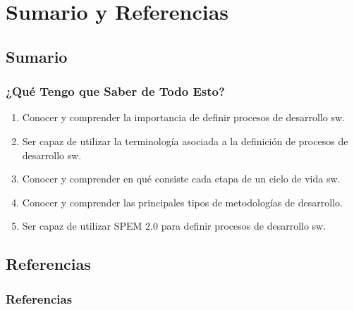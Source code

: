 \documentclass[a4paper,t]{beamer}
\begin{document}
\section{Sumario y Referencias}

\subsection{Sumario}

\begin{frame}[c]
    \frametitle{¿Qué Tengo que Saber de Todo Esto?}
    \begin{enumerate}[<+->]
        \item Conocer y comprender la importancia de definir procesos de desarrollo sw.
        \item Ser capaz de utilizar la terminología asociada a la definición de procesos de desarrollo sw.
        \item Conocer y comprender en qué consiste cada etapa de un ciclo de vida sw.
        \item Conocer y comprender las principales tipos de metodologías de desarrollo.
        \item Ser capaz de utilizar SPEM 2.0 para definir procesos de desarrollo sw.
    \end{enumerate}
\end{frame}

\subsection{Referencias}

\begin{frame}
	\frametitle{Referencias}
	
    
\end{frame}
\end{document}
